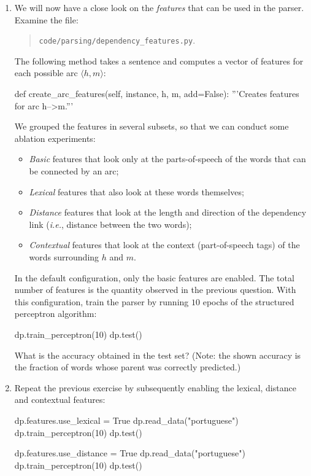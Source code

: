 \begin{exercise}
\begin{enumerate}
\item We will now have a close look on the \emph{features} that can be used in the parser. 
Examine the file:
\begin{quote}
{\tt code/parsing/dependency\_features.py}. 
\end{quote}
The following method takes a sentence and computes a vector of features for each possible arc $\langle h, m \rangle$: 
\begin{python}
def create_arc_features(self, instance, h, m, add=False):
	'''Creates features for arc h-->m.'''
\end{python}
We grouped the features in several subsets, so that we can conduct some ablation experiments: 
\begin{itemize}
\item \emph{Basic} features that look only at the parts-of-speech of the words that can be connected by an arc;
\item \emph{Lexical} features that also look at these words themselves;
\item \emph{Distance} features that look at the length and direction of the dependency link (\emph{i.e.}, distance between the two words);
\item \emph{Contextual} features that look at the context (part-of-speech tags) of the words 
surrounding $h$ and $m$. 
\end{itemize}
In the default configuration, only the basic features are enabled. The total number of features 
is the quantity observed in the previous question. 
With this configuration, 
train the parser by running $10$ epochs of the structured perceptron algorithm: 
\begin{python}
dp.train_perceptron(10)
dp.test()
\end{python}
What is the accuracy obtained in the test set? (Note: the shown accuracy is the fraction of words whose parent was correctly predicted.)\\
\item Repeat the previous exercise by 
subsequently enabling the lexical, distance and contextual features:
\begin{python}
dp.features.use_lexical = True
dp.read_data("portuguese")
dp.train_perceptron(10)
dp.test()

dp.features.use_distance = True
dp.read_data("portuguese")
dp.train_perceptron(10)
dp.test()


\end{python}
\end{enumerate}
\end{exercise}

